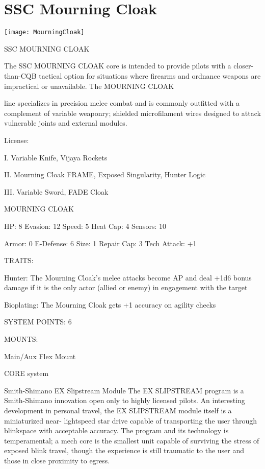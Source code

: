 \section{SSC Mourning Cloak}

\centering\texttt{[image: MourningCloak]}


                                    SSC MOURNING CLOAK

The SSC MOURNING CLOAK core is intended to provide pilots with a closer-than-CQB tactical option for
situations where firearms and ordnance weapons are impractical or unavailable. The MOURNING CLOAK

line specializes in precision melee combat and is commonly outfitted with a complement of variable
weaponry; shielded microfilament wires designed to attack vulnerable joints and external modules.


                                                  License:

I. Variable Knife, Vijaya Rockets

II. Mourning Cloak FRAME, Exposed Singularity, Hunter Logic

III. Variable Sword, FADE Cloak


                                           MOURNING CLOAK

  HP: 8          Evasion: 12                          Speed: 5           Heat Cap: 4        Sensors: 10

  Armor: 0       E-Defense: 6                         Size: 1            Repair Cap: 3      Tech Attack:
                                                                                            +1

                                                   TRAITS:

  Hunter: The Mourning Cloak’s melee attacks become AP and deal +1d6 bonus damage if it is the only
  actor (allied or enemy) in engagement with the target

  Bioplating: The Mourning Cloak gets +1 accuracy on agility checks

                                             SYSTEM POINTS: 6

                                                  MOUNTS:

  Main/Aux                                             Flex Mount

                                                CORE system




                                     Smith-Shimano EX Slipstream Module
   The EX SLIPSTREAM program is a Smith-Shimano innovation open only to highly licensed pilots. An
  interesting development in personal travel, the EX SLIPSTREAM module itself is a miniaturized near-
  lightspeed star drive capable of transporting the user through blinkspace with acceptable accuracy. The
  program and its technology is temperamental; a mech core is the smallest unit capable of surviving the
  stress of exposed blink travel, though the experience is still traumatic to the user and those in close
  proximity to egress.


